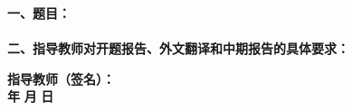 
\newpage
\thispagestyle{empty}

\begin{tabbing}
\hspace{5mm}\songti\sihao \textbf{一、题目：}\underline{\makebox[12cm]{\textbf{\zjutitlec}}}
\\ \\
\hspace{5mm}\songti\sihao \textbf{二、指导教师对开题报告、外文翻译和中期报告的具体要求：}
\end{tabbing}

\vspace{140mm}

\begin{tabbing}
\hspace{80mm}\songti\xiaosi \textbf{指导教师（签名）：}
\\ \hspace{90mm} \songti\xiaosi \textbf{年} \hspace{5mm} \songti\xiaosi \textbf{月} \hspace{5mm} \songti\xiaosi \textbf{日}
\end{tabbing}

